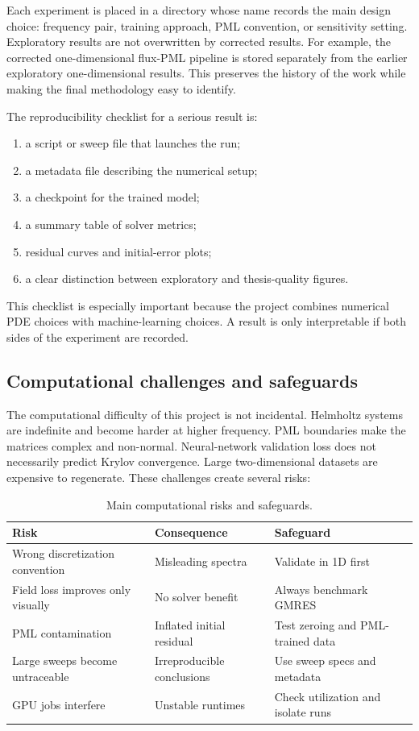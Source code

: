 Each experiment is placed in a directory whose name records the main design
choice: frequency pair, training approach, PML convention, or sensitivity
setting. Exploratory results are not overwritten by corrected results. For
example, the corrected one-dimensional flux-PML pipeline is stored separately
from the earlier exploratory one-dimensional results. This preserves the
history of the work while making the final methodology easy to identify.

The reproducibility checklist for a serious result is:
\begin{enumerate}
    \item a script or sweep file that launches the run;
    \item a metadata file describing the numerical setup;
    \item a checkpoint for the trained model;
    \item a summary table of solver metrics;
    \item residual curves and initial-error plots;
    \item a clear distinction between exploratory and thesis-quality figures.
\end{enumerate}
This checklist is especially important because the project combines numerical
PDE choices with machine-learning choices. A result is only interpretable if
both sides of the experiment are recorded.


\subsection{Computational challenges and safeguards}
\label{subsec:computational_challenges}

The computational difficulty of this project is not incidental. Helmholtz
systems are indefinite and become harder at higher frequency. PML boundaries
make the matrices complex and non-normal. Neural-network validation loss does
not necessarily predict Krylov convergence. Large two-dimensional datasets
are expensive to regenerate. These challenges create several risks:
\begin{table}[h]
\centering
\begin{tabular}{lll}
\toprule
Risk & Consequence & Safeguard \\
\midrule
Wrong discretization convention & Misleading spectra & Validate in 1D first \\
Field loss improves only visually & No solver benefit & Always benchmark GMRES \\
PML contamination & Inflated initial residual & Test zeroing and PML-trained data \\
Large sweeps become untraceable & Irreproducible conclusions & Use sweep specs and metadata \\
GPU jobs interfere & Unstable runtimes & Check utilization and isolate runs \\
\bottomrule
\end{tabular}
\caption{Main computational risks and safeguards.}
\label{tab:computational_risks}
\end{table}

